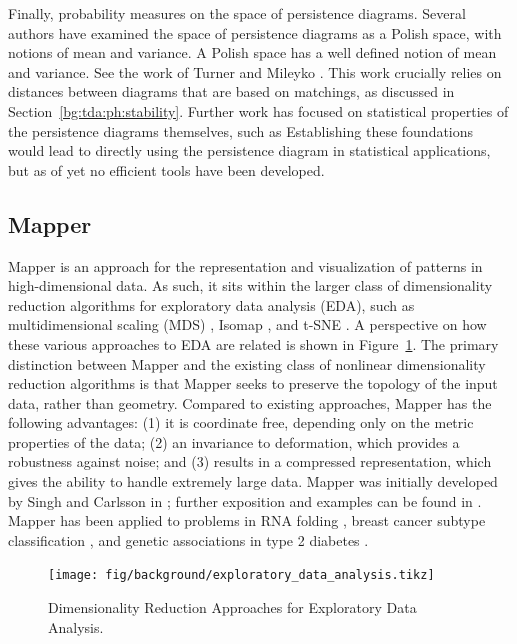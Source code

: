 Finally, probability measures on the space of persistence diagrams.
Several authors have examined the space of persistence diagrams as a Polish space, with notions of mean and variance.
A Polish space has a well defined notion of mean and variance.
See the work of Turner \cite{Turner:2012wb} and Mileyko \cite{Mileyko:2011jm}.
This work crucially relies on distances between diagrams that are based on matchings, as discussed in Section~\ref{bg:tda:ph:stability}.
Further work has focused on statistical properties of the persistence diagrams themselves, such as \cite{Chazal:2014vl}
Establishing these foundations would lead to directly using the persistence diagram in statistical applications, but as of yet no efficient tools have been developed.

\subsection{Mapper}
\label{bg:tda:mapper}

Mapper is an approach for the representation and visualization of patterns in high-dimensional data.
As such, it sits within the larger class of dimensionality reduction algorithms for exploratory data analysis (EDA), such as multidimensional scaling (MDS) \cite{Kruskal:1964}, Isomap \cite{Tenenbaum:2000vq}, and t-SNE \cite{VanderMaaten:2008tm}.
A perspective on how these various approaches to EDA are related is shown in Figure~\ref{fig:bg:exploratory_data_analysis}.
The primary distinction between Mapper and the existing class of nonlinear dimensionality reduction algorithms is that Mapper seeks to preserve the topology of the input data, rather than geometry.
Compared to existing approaches, Mapper has the following advantages: (1) it is coordinate free, depending only on the metric properties of the data; (2) an invariance to deformation, which provides a robustness against noise; and (3) results in a compressed representation, which gives the ability to handle extremely large data.
Mapper was initially developed by Singh and Carlsson in \cite{Singh:2007ve}; further exposition and examples can be found in \cite{Lum:2013cz}.
Mapper has been applied to problems in RNA folding \cite{Bowman:2008esa}, breast cancer subtype classification \cite{Nicolau:2011}, and genetic associations in type 2 diabetes \cite{Li:2015gl}.

\begin{figure}
	\centering
	\texttt{[image: fig/background/exploratory\_data\_analysis.tikz]}
	\caption[Dimensionality Reduction for EDA]{Dimensionality Reduction Approaches for Exploratory Data Analysis.}
	\label{fig:bg:exploratory_data_analysis}
\end{figure}

